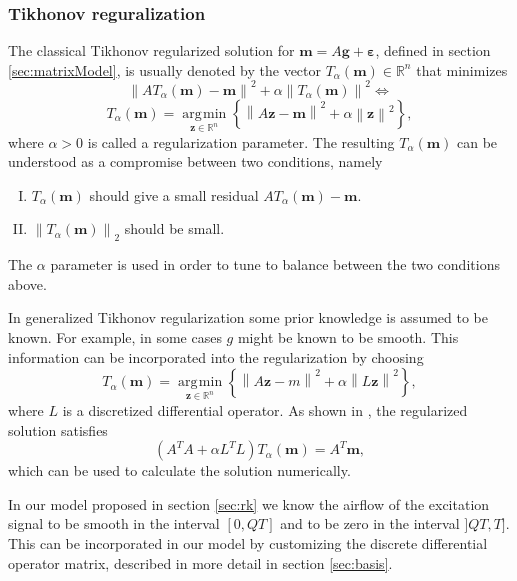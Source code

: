 \documentclass[12pt,a4]{article}
\DeclareMathOperator*{\argmin}{\arg\!\min}
\newcommand{\R}{{\mathbb R}}
\newcommand{\lnorm}{\left\|}
\newcommand{\rnorm}{\right\|}
\newcommand{\eps}{\ensuremath{\varepsilon}}
\newcommand{\vc}[1]{\ensuremath{\bm{#1}}}
\begin{document}
\subsubsection{Tikhonov reguralization}\label{sec:tikh}
The classical Tikhonov regularized solution for $\vc{m} = A \vc{g} + \vc{\eps}$, defined in section \ref{sec:matrixModel}, is usually denoted by the vector $T_\alpha( \vc{m} ) \in \R^n$ that minimizes
\begin{equation*}
\lnorm AT_\alpha( \vc{m} ) - \vc{m} \rnorm^2 + \alpha \lnorm T_\alpha( \vc{m} ) \rnorm^2 \Leftrightarrow
\end{equation*}
\begin{equation*}
T_\alpha( \vc{m} ) = \underset{ \vc{z} \in \R^n}{\argmin}
\left\{ \lnorm A \vc{z} - \vc{m} \rnorm^2 + \alpha \lnorm \vc{z} \rnorm^2 \right\},
\end{equation*}
where $\alpha > 0$ is called a regularization parameter. The resulting $T_\alpha( \vc{m} )$ can be understood as a compromise between two conditions, namely
\begin{enumerate}[I.]
 \item $T_\alpha( \vc{m} )$ should give a small residual $AT_\alpha( \vc{m} ) - \vc{m}$.
 \item $\lnorm T_\alpha( \vc{m} ) \rnorm_2$ should be small.
\end{enumerate}
The $\alpha$ parameter is used in order to tune to balance between the two conditions above.

In generalized Tikhonov regularization some prior knowledge is assumed to be known. For example, in some cases $g$ might be known to be smooth. This information can be incorporated into the regularization by choosing
\begin{equation}
T_\alpha( \vc{m} ) = \underset{\vc{z} \in \R^n}{\argmin}
\left\{ \lnorm A \vc{z} - m \rnorm^2 + \alpha \lnorm L \vc{z} \rnorm^2 \right\},
\end{equation}  
where $L$ is a discretized differential operator. As shown in \cite{samu}, the regularized solution satisfies
\begin{equation}
\label{eq:tik-normal}
\left( A^T A + \alpha L^T L \right) T_{\alpha}( \vc{m} ) = A^T \vc{m} ,
\end{equation}
which can be used to calculate the solution numerically.
 
In our model proposed in section \ref{sec:rk} we know the airflow of the excitation signal to be smooth in the interval $[0, QT]$ and to be zero in the interval $]QT, T]$. This can be incorporated in our model by customizing the discrete differential operator matrix, described in more detail in section \ref{sec:basis}.
\end{document}
